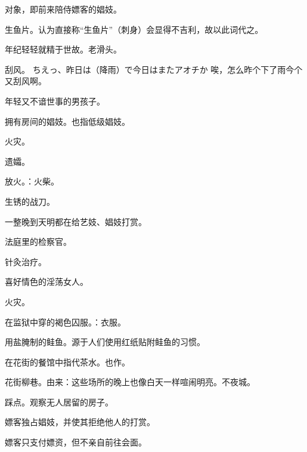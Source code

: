 


{对象，即前来陪侍嫖客的娼妓。}

{生鱼片。认为直接称“生鱼片”（刺身）会显得不吉利，故以此词代之。}

{年纪轻轻就精于世故。老滑头。} %

{刮风。
  \itemquote
  {ちえっ、昨日は（降雨）で今日はまたアオチか}
{唉，怎么昨个下了雨今个又刮风啊。}}

{年轻又不谙世事的男孩子。}

{拥有房间的娼妓。也指低级娼妓。}

{火灾。}

{遗孀。}

{放火。：火柴。}

{生锈的战刀。}

{一整晚到天明都在给艺妓、娼妓打赏。}

{法庭里的检察官。}

{针灸治疗。}

{喜好情色的淫荡女人。}

{火灾。}

{在监狱中穿的褐色囚服。：衣服。}

{用盐腌制的鲑鱼。源于人们使用红纸贴附鲑鱼的习惯。}

{在花街的餐馆中指代茶水。也作。}

{花街柳巷。由来：这些场所的晚上也像白天一样喧闹明亮。不夜城。}

{踩点。观察无人居留的房子。}

{嫖客独占娼妓，并使其拒绝他人的打赏。}

{嫖客只支付嫖资，但不亲自前往会面。}

